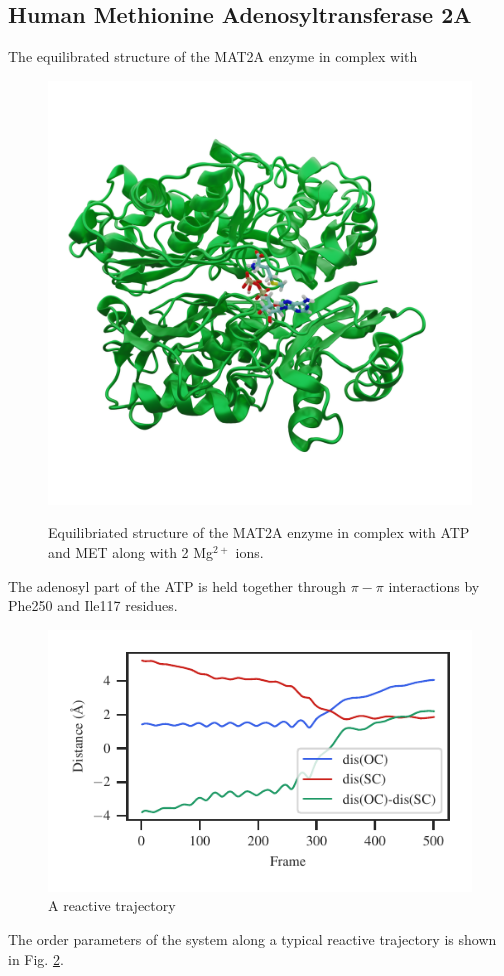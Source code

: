\documentclass[journal=jpcbfk,manuscript=article,layout=twocolumn]{achemso}
\begin{document}
\subsection{Human Methionine Adenosyltransferase 2A}
The equilibrated structure of the MAT2A enzyme in complex with 
\begin{figure}[ht!]
\includegraphics[scale=0.2]{figures/mat2a-equil.png}
\label{fig:mat2a-equil}
\caption{Equilibriated structure of the MAT2A enzyme in complex with ATP and 
MET along with 2 Mg$^{2+}$ ions.}
\end{figure}
The adenosyl part of the ATP is held together through $\pi-\pi$ interactions 
by Phe250 and Ile117 residues. 

\begin{figure}
\includegraphics[scale=1.0]{figures/mat2a-diff167.pdf}
\caption{A reactive trajectory}
\label{fig:mat2a-reactive-traj}
\end{figure}
The order parameters of the system along a typical reactive trajectory is 
shown in Fig. \ref{fig:mat2a-reactive-traj}.
\end{document}
